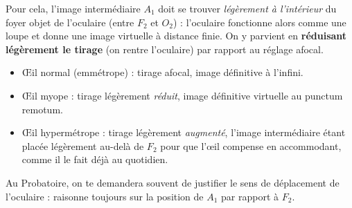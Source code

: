 \documentclass[11pt]{article}
\begin{document}
Pour cela, l'image intermédiaire $A_1$ doit se trouver \emph{légèrement à l'intérieur} du foyer objet de l'oculaire (entre $F_2$ et $O_2$) : l'oculaire fonctionne alors comme une loupe et donne une image virtuelle à distance finie. On y parvient en \textbf{réduisant légèrement le tirage} (on rentre l'oculaire) par rapport au réglage afocal.

\begin{aretenir}
\begin{itemize}
\item Œil normal (emmétrope) : tirage afocal, image définitive à l'infini.
\item Œil myope : tirage légèrement \emph{réduit}, image définitive virtuelle au punctum remotum.
\item Œil hypermétrope : tirage légèrement \emph{augmenté}, l'image intermédiaire étant placée légèrement au-delà de $F_2$ pour que l'œil compense en accommodant, comme il le fait déjà au quotidien.
\end{itemize}
Au Probatoire, on te demandera souvent de justifier le sens de déplacement de l'oculaire : raisonne toujours sur la position de $A_1$ par rapport à $F_2$.
\end{aretenir}
\end{document}
